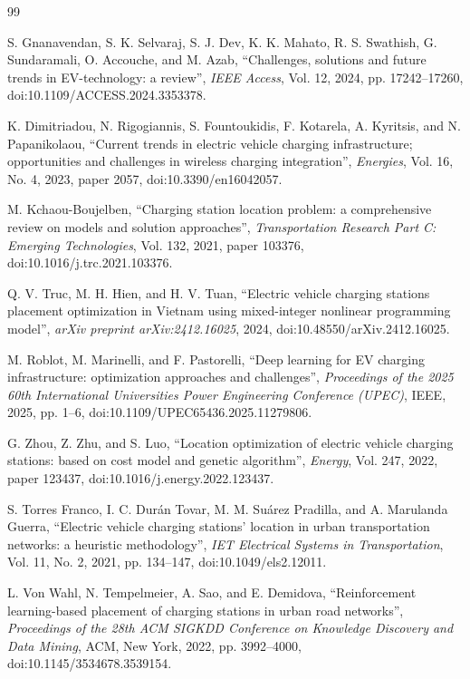 \documentclass[graybox]{svmult}
\begin{document}
\begin{thebibliography}{99}

S. Gnanavendan, S. K. Selvaraj, S. J. Dev, K. K. Mahato, R. S. Swathish, G.
Sundaramali, O. Accouche, and M. Azab, ``Challenges, solutions and future
trends in EV-technology: a review'', {\it IEEE Access}, Vol. 12, 2024, pp.
17242--17260, doi:10.1109/ACCESS.2024.3353378.

K. Dimitriadou, N. Rigogiannis, S. Fountoukidis, F. Kotarela, A. Kyritsis, and
N. Papanikolaou, ``Current trends in electric vehicle charging infrastructure;
opportunities and challenges in wireless charging integration'', {\it
Energies}, Vol. 16, No. 4, 2023, paper 2057,
doi:10.3390/en16042057.

M. Kchaou-Boujelben, ``Charging station location problem: a comprehensive
review on models and solution approaches'', {\it Transportation Research Part
C: Emerging Technologies}, Vol. 132, 2021, paper 103376,
doi:10.1016/j.trc.2021.103376.

Q. V. Truc, M. H. Hien, and H. V. Tuan, ``Electric vehicle charging stations
placement optimization in Vietnam using mixed-integer nonlinear programming
model'', {\it arXiv preprint arXiv:2412.16025}, 2024,
doi:10.48550/arXiv.2412.16025.

M. Roblot, M. Marinelli, and F. Pastorelli, ``Deep learning for EV charging
infrastructure: optimization approaches and challenges'', {\it Proceedings of
the 2025 60th International Universities Power Engineering Conference (UPEC)},
IEEE, 2025, pp. 1--6, doi:10.1109/UPEC65436.2025.11279806.

G. Zhou, Z. Zhu, and S. Luo, ``Location optimization of electric vehicle
charging stations: based on cost model and genetic algorithm'', {\it Energy},
Vol. 247, 2022, paper 123437, doi:10.1016/j.energy.2022.123437.

S. Torres Franco, I. C. Dur\'an Tovar, M. M. Su\'arez Pradilla, and A.
Marulanda Guerra, ``Electric vehicle charging stations' location in urban
transportation networks: a heuristic methodology'', {\it IET Electrical
Systems in Transportation}, Vol. 11, No. 2, 2021, pp. 134--147,
doi:10.1049/els2.12011.

L. Von Wahl, N. Tempelmeier, A. Sao, and E. Demidova, ``Reinforcement
learning-based placement of charging stations in urban road networks'', {\it
Proceedings of the 28th ACM SIGKDD Conference on Knowledge Discovery and Data
Mining}, ACM, New York, 2022, pp. 3992--4000, doi:10.1145/3534678.3539154.


\end{thebibliography}
\end{document}
